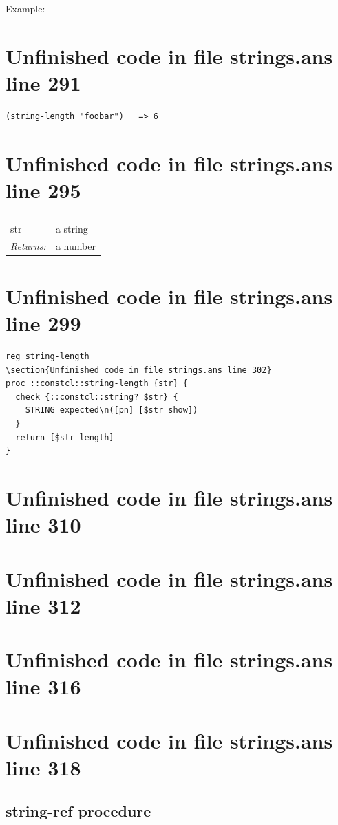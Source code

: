 \documentclass[twoside,9pt]{report}
\begin{document}
Example:

\section{Unfinished code in file strings.ans line 291}
\begin{verbatim}
(string-length "foobar")   => 6
\end{verbatim}
\section{Unfinished code in file strings.ans line 295}
\noindent\begin{tabular}{ |p{1.9cm} p{8cm}| }
\hline
\rowcolor[HTML]{CCCCCC} \multicolumn{2}{|l|}{\bf string-length (public)} \\
str & a string \\
\textit{Returns:} & a number \\
\hline
\end{tabular}
\section{Unfinished code in file strings.ans line 299}
\begin{lstlisting}
reg string-length
\section{Unfinished code in file strings.ans line 302}
proc ::constcl::string-length {str} {
  check {::constcl::string? $str} {
    STRING expected\n([pn] [$str show])
  }
  return [$str length]
}
\end{lstlisting}
\section{Unfinished code in file strings.ans line 310}
\section{Unfinished code in file strings.ans line 312}
\section{Unfinished code in file strings.ans line 316}
\section{Unfinished code in file strings.ans line 318}
\subsection{string-ref procedure}
\label{string-ref-procedure}
\end{document}
